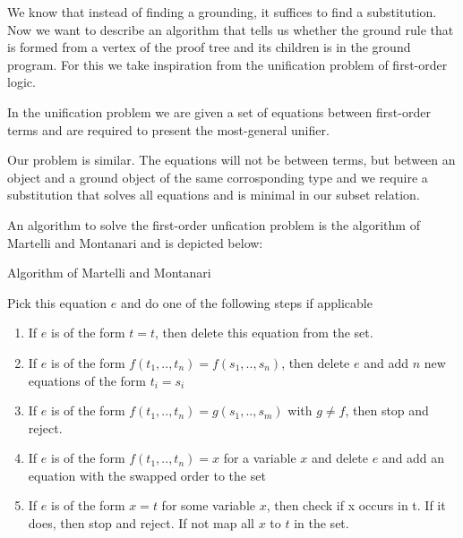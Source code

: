 We know that instead of finding a grounding, it suffices to find a substitution. Now we want to describe an algorithm that tells us whether the ground rule that is formed from a vertex of the proof tree and its children is in the ground program. For this we take inspiration from the unification problem of first-order logic.

In the unification problem we are given a set of equations between first-order terms and are required to present the most-general unifier.

Our problem is similar. The equations will not be between terms, but between an object and a ground object of the same corrosponding type and we require a substitution that solves all equations and is minimal in our subset relation.

An algorithm to solve the first-order unfication problem is the algorithm of Martelli and Montanari \cite{MartMont} and is depicted below:
\begin{algorithm}
    \caption{Algorithm of Martelli and Montanari}
\begin{algorithmic}
    \State Pick this equation $e$ and do one of the following steps if applicable
    \begin{enumerate}
        \item If $e$ is of the form $t = t$, then delete this equation from the set.
        \item If $e$ is of the form $f(t_1, .., t_n) = f(s_1,.., s_n)$, then delete $e$ and add $n$ new equations of the form $t_i = s_i$
        \item If $e$ is of the form $f(t_1, .., t_n) = g(s_1,.., s_m)$ with $g \neq f$, then stop and reject.
        \item If $e$ is of the form $f(t_1,..,t_n) = x$ for a variable $x$ and delete $e$ and add an equation with the swapped order to the set
        \item If $e$ is of the form $x=t$ for some variable $x$, then check if x occurs in t. If it does, then stop and reject. If not map all $x$ to $t$ in the set.
    \end{enumerate}
    \EndWhile
\end{algorithmic}
\end{algorithm}

